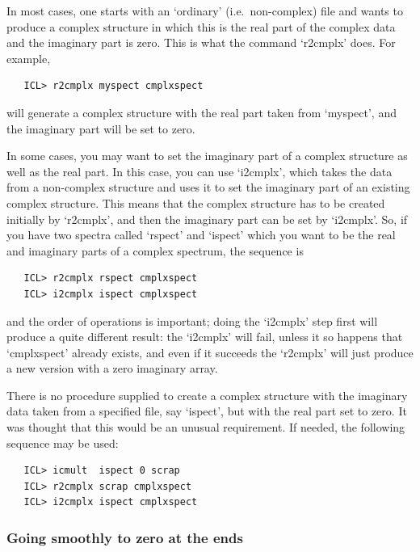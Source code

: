    In most cases, one starts with an `ordinary' (i.e.\ non-complex) file
   and wants to produce a complex structure in which this is the real
   part of the complex data and the imaginary part is zero.  This is
   what the command `r2cmplx' does.  For example,

\begin{verbatim}
   ICL> r2cmplx myspect cmplxspect
\end{verbatim}

   will generate a complex structure with the real part taken from
   `myspect', and the imaginary part will be set to zero.

   In some cases, you may want to set the imaginary part of a complex
   structure as well as the real part.  In this case, you can use
   `i2cmplx', which takes the data from a non-complex structure and uses
   it to set the imaginary part of an existing complex structure.  This
   means that the complex structure has to be created initially by
   `r2cmplx', and then the imaginary part can be set by `i2cmplx'. So,
   if you have two spectra called `rspect' and `ispect' which you want
   to be the real and imaginary parts of a complex spectrum, the
   sequence is

\begin{verbatim}
   ICL> r2cmplx rspect cmplxspect
   ICL> i2cmplx ispect cmplxspect
\end{verbatim}

   and the order of operations is important; doing the `i2cmplx' step
   first will produce a quite different result: the `i2cmplx' will fail,
   unless it so happens that `cmplxspect' already exists, and even if it
   succeeds the `r2cmplx' will just produce a new version with a zero
   imaginary array.

   There is no procedure supplied to create a complex structure with
   the imaginary data taken from a specified file, say `ispect', but
   with the real part set to zero.  It was thought that this would be an
   unusual requirement.  If needed, the following sequence may be used:

\begin{verbatim}
   ICL> icmult  ispect 0 scrap
   ICL> r2cmplx scrap cmplxspect
   ICL> i2cmplx ispect cmplxspect
\end{verbatim}


\subsubsection{\label{techno6zeroedge}Going smoothly to zero at the ends}

